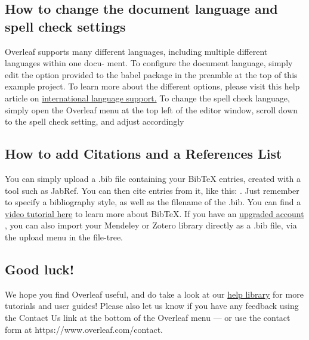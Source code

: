 \documentclass{article}
\begin{document}
   \subsection{How to change the document language and spell check settings} 
   Overleaf supports many different languages, including multiple different languages within one docu-
   ment.
   To configure the document language, simply edit the option provided to the babel package in the
   preamble at the top of this example project. To learn more about the different options, please visit
   this help article on \href{https://www.overleaf.com/learn/latex/International_language_support}{international language support.} 
   To change the spell check language, simply open the Overleaf menu at the top left of the editor
   window, scroll down to the spell check setting, and adjust accordingly
   \subsection{How to add Citations and a References List}
   You can simply upload a .bib file containing your BibTeX entries, created with a tool such as JabRef.
   You can then cite entries from it, like this:\cite{lamport1986latex} . Just remember to specify a bibliography style, as
   well as the filename of the .bib. You can find a \href{https://www.overleaf.com/learn/latex/Questions/How_to_include_a_bibliography_using_bibtex}{video tutorial here}  to learn more about BibTeX.
   If you have an \href{https://www.overleaf.com/user/subscription/plans}{upgraded account} , you can also import your Mendeley or Zotero library directly as
   a .bib file, via the upload menu in the file-tree.
   \subsection{Good luck!}
   We hope you find Overleaf useful, and do take a look at our \href{https://www.overleaf.com/learn}{help library} for more tutorials and user
   guides! Please also let us know if you have any feedback using the Contact Us link at the bottom of 
   the Overleaf menu — or use the contact form at https://www.overleaf.com/contact.
  
  
\end{document}

